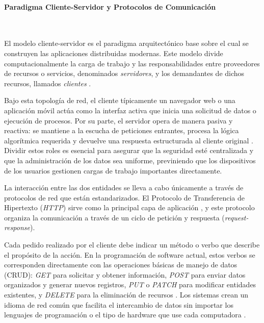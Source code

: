 \paragraph{Paradigma Cliente-Servidor y Protocolos de Comunicación}
\leavevmode \\ \hypertarget{target:cliente-servidor}{} 

El modelo cliente-servidor es el paradigma arquitectónico base sobre el cual se construyen las aplicaciones distribuidas modernas. Este modelo divide computacionalmente la carga de trabajo y las responsabilidades entre proveedores de recursos o servicios, denominados \textit{servidores}, y los demandantes de dichos recursos, llamados \textit{clientes} \cite{kurose_networking_2021}. 

Bajo esta topología de red, el cliente típicamente un navegador web o una aplicación móvil actúa como la interfaz activa que inicia una solicitud de datos o ejecución de procesos. Por su parte, el servidor opera de manera pasiva y reactiva: se mantiene a la escucha de peticiones entrantes, procesa la lógica algorítmica requerida y devuelve una respuesta estructurada al cliente original \cite{sommerville_se_2015}. Dividir estos roles es esencial para asegurar que la seguridad esté centralizada y que la administración de los datos sea uniforme, previniendo que los dispositivos de los usuarios gestionen cargas de trabajo importantes directamente.

La interacción entre las dos entidades se lleva a cabo únicamente a través de protocolos de red que están estandarizados. El Protocolo de Transferencia de Hipertexto (\emph{HTTP}) sirve como la principal capa de aplicación \cite{kurose_networking_2021}, y este protocolo organiza la comunicación a través de un ciclo de petición y respuesta (\textit{request-response}). 

 Cada pedido realizado por el cliente debe indicar un método o verbo que describe el propósito de la acción. En la programación de software actual, estos verbos se corresponden directamente con las operaciones básicas de manejo de datos (CRUD): \textit{GET} para solicitar y obtener información, \textit{POST} para enviar datos organizados y generar nuevos registros, \textit{PUT} o \textit{PATCH}  para modificar entidades existentes, y \textit{DELETE} para la eliminación de recursos \cite{kurose_networking_2021}. Los sistemas crean un idioma de red común que facilita el intercambio de datos sin importar los lenguajes de programación o el tipo de hardware que use cada computadora \cite{sommerville_se_2015}.

